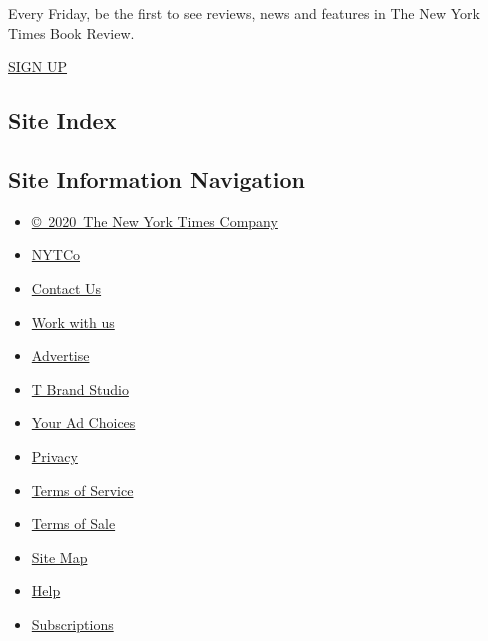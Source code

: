 Every Friday, be the first to see reviews, news and features in The New
York Times Book Review.

\href{/newsletters/signup/BK}{SIGN UP}

\hypertarget{site-index}{%
\subsection{Site Index}\label{site-index}}

\hypertarget{site-information-navigation}{%
\subsection{Site Information
Navigation}\label{site-information-navigation}}

\begin{itemize}
\tightlist
\item
  \href{https://help.nytimes3xbfgragh.onion/hc/en-us/articles/115014792127-Copyright-notice}{©~2020~The
  New York Times Company}
\end{itemize}

\begin{itemize}
\tightlist
\item
  \href{https://www.nytco.com/}{NYTCo}
\item
  \href{https://help.nytimes3xbfgragh.onion/hc/en-us/articles/115015385887-Contact-Us}{Contact
  Us}
\item
  \href{https://www.nytco.com/careers/}{Work with us}
\item
  \href{https://nytmediakit.com/}{Advertise}
\item
  \href{http://www.tbrandstudio.com/}{T Brand Studio}
\item
  \href{https://www.nytimes3xbfgragh.onion/privacy/cookie-policy\#how-do-i-manage-trackers}{Your
  Ad Choices}
\item
  \href{https://www.nytimes3xbfgragh.onion/privacy}{Privacy}
\item
  \href{https://help.nytimes3xbfgragh.onion/hc/en-us/articles/115014893428-Terms-of-service}{Terms
  of Service}
\item
  \href{https://help.nytimes3xbfgragh.onion/hc/en-us/articles/115014893968-Terms-of-sale}{Terms
  of Sale}
\item
  \href{https://spiderbites.nytimes3xbfgragh.onion}{Site Map}
\item
  \href{https://help.nytimes3xbfgragh.onion/hc/en-us}{Help}
\item
  \href{https://www.nytimes3xbfgragh.onion/subscription?campaignId=37WXW}{Subscriptions}
\end{itemize}
